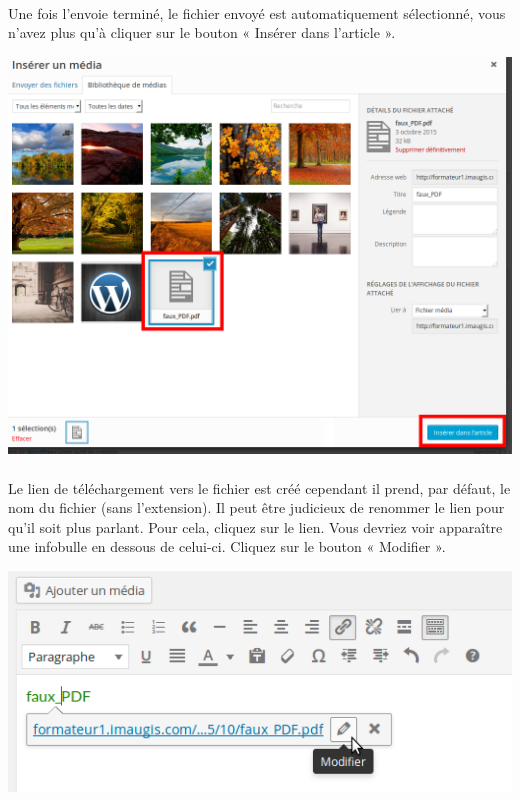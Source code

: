 \documentclass[10pt,a4paper]{article}
\begin{document}
\paragraph{}Une fois l'envoie terminé, le fichier envoyé est automatiquement sélectionné, vous n'avez plus qu'à cliquer sur le bouton « Insérer dans l'article ».
\begin{center}
\includegraphics[scale=0.3]{img/0082.png}
\end{center}
\paragraph{}Le lien de téléchargement vers le fichier est créé cependant il prend, par défaut, le nom du fichier (sans l'extension). Il peut être judicieux de renommer le lien pour qu'il soit plus parlant. Pour cela, cliquez sur le lien. Vous devriez voir apparaître une infobulle en dessous de celui-ci. Cliquez sur le bouton « Modifier ».
\begin{center}
\includegraphics[scale=0.3]{img/0086.png}
\end{center}
\end{document}
